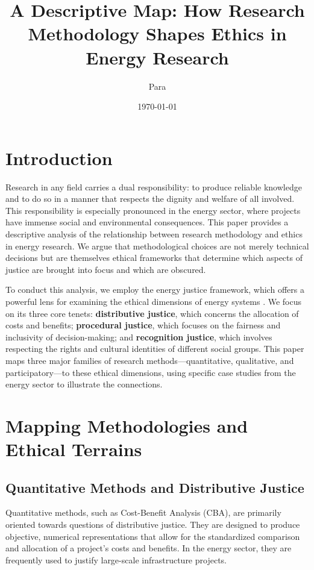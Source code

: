 \documentclass[11pt, letterpaper]{article}
\title{A Descriptive Map: How Research Methodology Shapes Ethics in Energy Research}
\author{Para}
\date{\today}
\begin{document}
\maketitle

\section*{Introduction}
Research in any field carries a dual responsibility: to produce reliable knowledge and to do so in a manner that respects the dignity and welfare of all involved. This responsibility is especially pronounced in the energy sector, where projects have immense social and environmental consequences. This paper provides a descriptive analysis of the relationship between research methodology and ethics in energy research. We argue that methodological choices are not merely technical decisions but are themselves ethical frameworks that determine which aspects of justice are brought into focus and which are obscured.

To conduct this analysis, we employ the energy justice framework, which offers a powerful lens for examining the ethical dimensions of energy systems \citep{sovacool_dworkin_2015, jenkins_mccauley_heffron_2016}. We focus on its three core tenets: \textbf{distributive justice}, which concerns the allocation of costs and benefits; \textbf{procedural justice}, which focuses on the fairness and inclusivity of decision-making; and \textbf{recognition justice}, which involves respecting the rights and cultural identities of different social groups. This paper maps three major families of research methods---quantitative, qualitative, and participatory---to these ethical dimensions, using specific case studies from the energy sector to illustrate the connections.

\section*{Mapping Methodologies and Ethical Terrains}

\subsection*{Quantitative Methods and Distributive Justice}
Quantitative methods, such as Cost-Benefit Analysis (CBA), are primarily oriented towards questions of distributive justice. They are designed to produce objective, numerical representations that allow for the standardized comparison and allocation of a project's costs and benefits. In the energy sector, they are frequently used to justify large-scale infrastructure projects.
\end{document}
